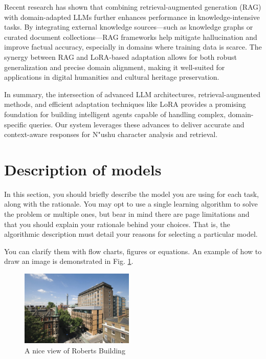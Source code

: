 \documentclass{article}
\begin{document}
    Recent research has shown that combining retrieval-augmented generation (RAG) with domain-adapted LLMs further enhances performance in knowledge-intensive tasks. By integrating external knowledge sources—such as knowledge graphs or curated document collections—RAG frameworks help mitigate hallucination and improve factual accuracy, especially in domains where training data is scarce. The synergy between RAG and LoRA-based adaptation allows for both robust generalization and precise domain alignment, making it well-suited for applications in digital humanities and cultural heritage preservation.

    In summary, the intersection of advanced LLM architectures, retrieval-augmented methods, and efficient adaptation techniques like LoRA provides a promising foundation for building intelligent agents capable of handling complex, domain-specific queries. Our system leverages these advances to deliver accurate and context-aware responses for N"{u}shu character analysis and retrieval.

\section{Description of models}
\label{sec:models}
    In this section, you should briefly describe the model you are using for each task, along with the rationale. You may opt to use a single learning algorithm to solve the problem or multiple ones, but bear in mind there are page limitations and that you should explain your rationale behind your choices. That is, the algorithmic description must detail your reasons for selecting a particular model.
    
    You can clarify them with flow charts, figures or equations. An example of how to draw an image is demonstrated in Fig. \ref{fig:roberts_building}.
    
    \begin{figure}[htb]
    \centering
    \includegraphics[width=0.48\textwidth]{images/Roberts_building.jpg}
    \caption{A nice view of Roberts Building}
    \label{fig:roberts_building}
    \end{figure}
    
\end{document}
